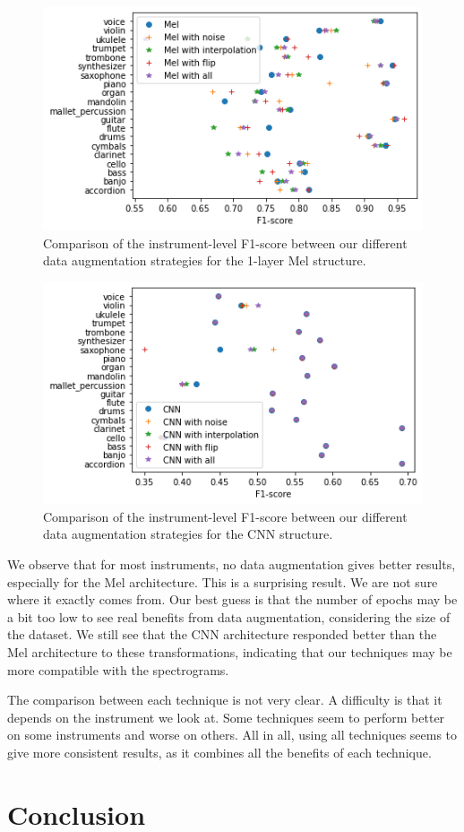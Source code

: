 \documentclass[final]{cvpr}
\begin{document}
\begin{figure}
	\centering
	\includegraphics[scale = 0.5]{mel_data.png}
	\caption{Comparison of the instrument-level F1-score between our different data augmentation strategies for the 1-layer Mel structure.}
	\label{mel_data}
\end{figure}
\begin{figure}
	\centering
	\includegraphics[scale = 0.5]{cnn_data.png}
	\caption{Comparison of the instrument-level F1-score between our different data augmentation strategies for the CNN structure.}
	\label{cnn_data}
\end{figure}
We observe that for most instruments, no data augmentation gives better results, especially for the Mel architecture. This is a surprising result. We are not sure where it exactly comes from. Our best guess is that the number of epochs may be a bit too low to see real benefits from data augmentation, considering the size of the dataset. We still see that the CNN architecture responded better than the Mel architecture to these transformations, indicating that our techniques may be more compatible with the spectrograms.

The comparison between each technique is not very clear. A difficulty is that it depends on the instrument we look at. Some techniques seem to perform better on some instruments and worse on others. All in all, using all techniques seems to give more consistent results, as it combines all the benefits of each technique.
\section{Conclusion}

{\small
	
	
}
\end{document}
